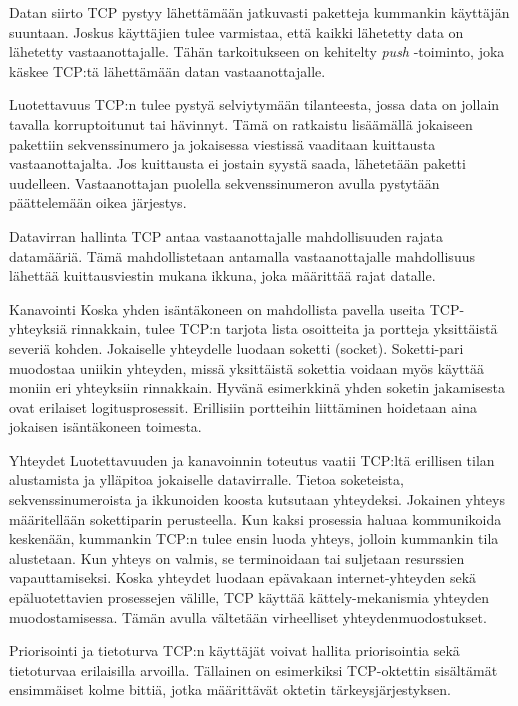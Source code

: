 \documentclass[utf8]{gradu3}
\begin{document}
\begin{desclist}
\item[Datan siirto] TCP pystyy lähettämään jatkuvasti paketteja kummankin käyttäjän suuntaan. Joskus käyttäjien tulee varmistaa, että kaikki lähetetty data on lähetetty vastaanottajalle. Tähän tarkoitukseen on kehitelty \emph{push} -toiminto, joka käskee TCP:tä
lähettämään datan vastaanottajalle.
\item[Luotettavuus] TCP:n tulee pystyä selviytymään tilanteesta, jossa data on jollain tavalla korruptoitunut tai hävinnyt. Tämä on ratkaistu lisäämällä jokaiseen pakettiin sekvenssinumero ja jokaisessa viestissä vaaditaan kuittausta vastaanottajalta. Jos kuittausta ei jostain syystä saada, lähetetään paketti uudelleen. Vastaanottajan puolella sekvenssinumeron avulla pystytään päättelemään oikea järjestys.
\item[Datavirran hallinta] TCP antaa vastaanottajalle mahdollisuuden rajata datamääriä. Tämä mahdollistetaan antamalla vastaanottajalle mahdollisuus lähettää kuittausviestin mukana ikkuna, joka määrittää rajat datalle.
\item[Kanavointi] Koska yhden isäntäkoneen on mahdollista pavella useita TCP-yhteyksiä rinnakkain, tulee TCP:n tarjota lista osoitteita ja portteja yksittäistä severiä kohden. Jokaiselle yhteydelle luodaan soketti (socket). Soketti-pari muodostaa uniikin yhteyden, missä yksittäistä sokettia voidaan myös käyttää moniin eri yhteyksiin rinnakkain. Hyvänä esimerkkinä yhden soketin jakamisesta ovat erilaiset logitusprosessit.  Erillisiin portteihin liittäminen hoidetaan aina jokaisen isäntäkoneen toimesta.
\item[Yhteydet] Luotettavuuden ja kanavoinnin toteutus vaatii TCP:ltä erillisen tilan alustamista ja ylläpitoa jokaiselle datavirralle. Tietoa soketeista, sekvenssinumeroista ja ikkunoiden koosta kutsutaan yhteydeksi. Jokainen yhteys määritellään sokettiparin perusteella. Kun kaksi prosessia haluaa kommunikoida keskenään, kummankin TCP:n tulee ensin luoda yhteys, jolloin kummankin tila alustetaan. Kun yhteys on valmis, se terminoidaan tai suljetaan resurssien vapauttamiseksi. Koska yhteydet luodaan epävakaan internet-yhteyden sekä epäluotettavien prosessejen välille, TCP käyttää kättely-mekanismia yhteyden muodostamisessa. Tämän avulla vältetään virheelliset yhteydenmuodostukset.
\item[Priorisointi ja tietoturva] TCP:n käyttäjät voivat hallita priorisointia sekä tietoturvaa erilaisilla arvoilla. Tällainen on esimerkiksi TCP-oktettin sisältämät ensimmäiset kolme bittiä, jotka määrittävät oktetin tärkeysjärjestyksen.
\end{desclist}
\end{document}
